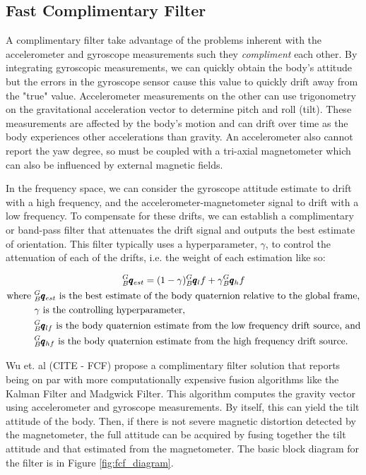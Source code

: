 \subsection{Fast Complimentary Filter} \label{ssec:complimentary_filter}
A complimentary filter take advantage of the problems inherent with the accelerometer and gyroscope measurements such they \textit{compliment} each other.
By integrating gyroscopic measurements, we can quickly obtain the body's attitude but the errors in the gyroscope sensor cause this value to quickly drift away from the "true" value.
Accelerometer measurements on the other can use trigonometry on the gravitational acceleration vector to determine pitch and roll (tilt).
These measurements are affected by the body's motion and can drift over time as the body experiences other accelerations than gravity.
An accelerometer also cannot report the yaw degree, so must be coupled with a tri-axial magnetometer which can also be influenced by external magnetic fields.

In the frequency space, we can consider the gyroscope attitude estimate to drift with a high frequency, and the accelerometer-magnetometer signal to drift with a low frequency.
To compensate for these drifts, we can establish a complimentary or band-pass filter that attenuates the drift signal and outputs the best estimate of orientation.
This filter typically uses a hyperparameter, $\gamma$, to control the attenuation of each of the drifts, i.e. the weight of each estimation like so:

\begin{gather} \label{eq:fcf}
    {}^G_B\pmb{q}_{est} = (1-\gamma){}^G_B\pmb{q}_lf + \gamma {}^G_B\pmb{q}_hf \\
    \begin{aligned}
        \text{where } &{}^G_B\pmb{q}_{est} \text{ is the best estimate of the body quaternion relative to the global frame,} \\
                      &\gamma \text{ is the controlling hyperparameter, } \\
                      &{}^G_B\pmb{q}_{lf} \text{ is the body quaternion estimate from the low frequency drift source, and} \\
                      &{}^G_B\pmb{q}_{hf} \text{ is the body quaternion estimate from the high frequency drift source.}
    \end{aligned} \notag
\end{gather}

Wu et. al (CITE - FCF) propose a complimentary filter solution that reports being on par with more computationally expensive fusion algorithms like the Kalman Filter and Madgwick Filter.
This algorithm computes the gravity vector using accelerometer and gyroscope measurements.
By itself, this can yield the tilt attitude of the body.
Then, if there is not severe magnetic distortion detected by the magnetometer, the full attitude can be acquired by fusing together the tilt attitude and that estimated from the magnetometer.
The basic block diagram for the filter is in Figure \ref{fig:fcf_diagram}.

